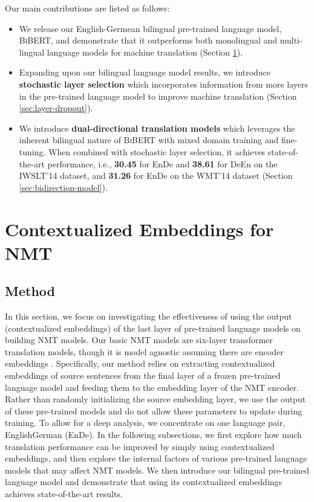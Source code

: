 \documentclass[11pt]{article}
\begin{document}
Our main contributions are listed as follows:
\begin{itemize}
  \itemsep0em 
  \item We release our English-Germean bilingual pre-trained language model, \textsc{BiBERT}, and demonstrate that it outperforms both monolingual and multi-lingual language models for machine translation (Section \ref{sec:contextualized_embedding}).
  \item Expanding upon our bilingual language model results, we introduce \textbf{stochastic layer selection} which incorporates information from more layers in the pre-trained language model to improve machine translation (Section \ref{sec:layer-dropout}).
  \item We introduce \textbf{dual-directional translation models} which leverages the inherent bilingual nature of \textsc{BiBERT} with mixed domain training and fine-tuning. When combined with stochastic layer selection, it achieves state-of-the-art performance, i.e., \textbf{30.45} for EnDe and \textbf{38.61} for DeEn on the IWSLT'14 dataset, and \textbf{31.26} for EnDe on the WMT'14 dataset
  (Section \ref{sec:bidirection-model}).
\end{itemize}

\section{Contextualized Embeddings for NMT }
\label{sec:contextualized_embedding}
\subsection{Method}
In this section, we focus on investigating the effectiveness of using the output (contextualized embeddings) of the last layer of pre-trained language models on building NMT models. Our basic NMT models are six-layer transformer translation models, though it is model agnostic assuming there are encoder embeddings \citep{NIPS2017_3f5ee243}. Specifically, our method relies on extracting contextualized embeddings of source sentences from the final layer of a frozen pre-trained language model and feeding them to the embedding layer of the NMT encoder. Rather than randomly initializing the source embedding layer, we use the output of these pre-trained models and do not allow these parameters to update during training. To allow for a deep analysis, we concentrate on one language pair, EnglishGerman (EnDe). In the following subsections, we first explore how much translation performance can be improved by simply using contextualized embeddings, and then explore the internal factors of various pre-trained language models that may affect NMT models. We then  introduce our bilingual pre-trained language model and demonstrate that using its contextualized embeddings achieves state-of-the-art results.
\end{document}
